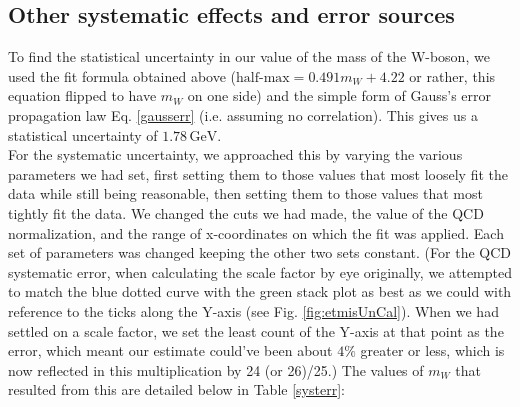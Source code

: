 \subsection{Other systematic effects and error sources}

\noindent To find the statistical uncertainty in our value of the mass of the W-boson, we used the fit formula obtained above ($\text{half-max} = 0.491 m_W + 4.22$ or rather, this equation flipped to have $m_W$ on one side) and the simple form of Gauss's error propagation law Eq. \ref{gausserr} (i.e. assuming no correlation). This gives us a statistical uncertainty of $1.78\,\text{GeV}$.\\

\noindent For the systematic uncertainty, we approached this by varying the various parameters we had set, first setting them to those values that most loosely fit the data while still being reasonable, then setting them to those values that most tightly fit the data. We changed the cuts we had made, the value of the QCD normalization, and the range of x-coordinates on which the fit was applied. Each set of parameters was changed keeping the other two sets constant. (For the QCD systematic error, when calculating the scale factor by eye originally, we attempted to match the blue dotted curve with the green stack plot as best as we could with reference to the ticks along the Y-axis (see Fig. \ref{fig:etmisUnCal}). When we had settled on a scale factor, we set the least count of the Y-axis at that point as the error, which meant our estimate could've been about $4\%$ greater or less, which is now reflected in this multiplication by 24 (or 26)/25.) The values of $m_W$ that resulted from this are detailed below in Table \ref{systerr}:


